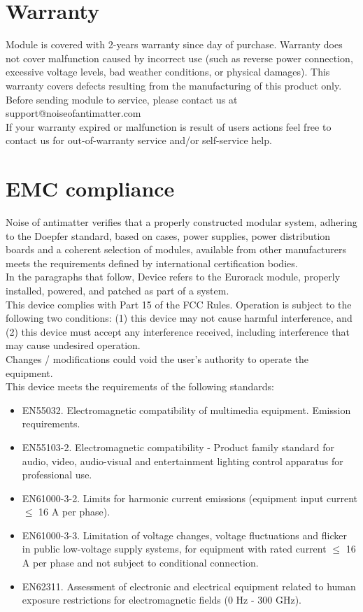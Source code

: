 \documentclass[a4paper,14pt]{extarticle}
\begin{document}
\section*{Warranty}
Module is covered with 2-years warranty since day of purchase. Warranty does not cover malfunction caused by incorrect use (such as reverse power connection, excessive voltage levels, bad weather conditions, or physical damages). This warranty covers defects resulting from the manufacturing of this product only. Before sending module to service, please contact us at support@noiseofantimatter.com\\
If your warranty expired or malfunction is result of users actions feel free to contact us for out-of-warranty service and/or self-service help.
\section*{EMC compliance}
Noise of antimatter verifies that a properly constructed modular system, adhering to the Doepfer standard, based on cases, power supplies, power distribution boards and a coherent selection of modules, available from other manufacturers meets the requirements defined by international certification bodies.\\

In the paragraphs that follow, Device refers to the Eurorack module, properly installed, powered, and patched as part of a system.\\
This device complies with Part 15 of the FCC Rules. Operation is subject to the following two conditions: (1) this device may not cause harmful interference, and (2) this device must accept any interference received, including interference that may cause undesired operation.\\
Changes / modifications could void the user’s authority to operate the equipment.
\\
This device meets the requirements of the following standards:
\begin{itemize}
\item    EN55032. Electromagnetic compatibility of multimedia equipment. Emission requirements.
\item    EN55103-2. Electromagnetic compatibility - Product family standard for audio, video, audio-visual and entertainment lighting control apparatus for professional use.
\item    EN61000-3-2. Limits for harmonic current emissions (equipment input current $\leq$ 16 A per phase).
\item    EN61000-3-3. Limitation of voltage changes, voltage fluctuations and flicker in public low-voltage supply systems, for equipment with rated current $\leq$ 16 A per phase and not subject to conditional connection.
\item    EN62311. Assessment of electronic and electrical equipment related to human exposure restrictions for electromagnetic fields (0 Hz - 300 GHz).
\end{itemize}
\end{document}
